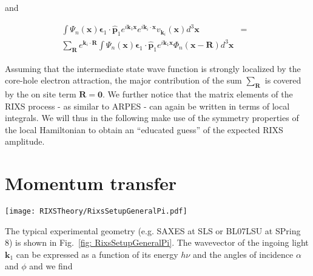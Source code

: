 \documentclass[twocolumn,prb,twocolumn,amsmath,superscriptaddress,nofootinbib,amssymb]{revtex4-1}
\newcommand{\vect}[1]{\boldsymbol{#1}}
\begin{document}
\begin{widetext}
\noindent and

\begin{eqnarray}
\int \Psi_n(\vect{x})  \vect{\epsilon}_1\cdot \hat{\vect{p}}_1 e^{i \vect{k}_1 \vect{x}} e^{i\vect{k}_i\cdot\vect{x}}v_{\vect{k}_i}(\vect{x}) d^3\vect{x} &=&\nonumber\\
\sum_{\vect{R}}e^{\vect{k}_i\cdot\vect{R}} \int \Psi_n(\vect{x})  \vect{\epsilon}_1\cdot \hat{\vect{p}}_1 e^{i \vect{k}_1 \vect{x}}
\Phi_n(\vect{x}-\vect{R}) d^3\vect{x}
\end{eqnarray}

Assuming that the intermediate state wave function is strongly localized by the core-hole electron attraction, the major contribution of the sum $\sum_{\vect{R}}$ is covered by the on site term $\vect{R}=\vect{0}$. We further notice that the matrix elements of the RIXS process - as similar to ARPES - can again be written in terms of local integrals. We will thus in the following make use of the symmetry properties of the local Hamiltonian to obtain an ``educated guess'' of the expected RIXS amplitude.


\section{Momentum transfer}

\begin{figure*}[htbp]
\begin{center}
        \texttt{[image: RIXSTheory/RixsSetupGeneralPi.pdf]}
\caption{\label{fig: RixsSetupGeneralPi} Typical RIXS experimental configuration as employed at SAXES at SLS or BL07LSU at SPring 8. The sample is represented by its natural coordinate system. The scattering angle $\tau$ is kept fixed while the momentum transfer direction is varied by changing $\alpha$.}
\end{center}
\end{figure*}


The typical experimental geometry (e.g. SAXES at SLS or BL07LSU at SPring 8) is shown in Fig.~\ref{fig: RixsSetupGeneralPi}. The wavevector of the ingoing light $\vect{k}_1$ can be expressed as a function of its energy $h\nu$ and the angles of incidence $\alpha$ and $\phi$ and we find


\end{widetext}
\end{document}
